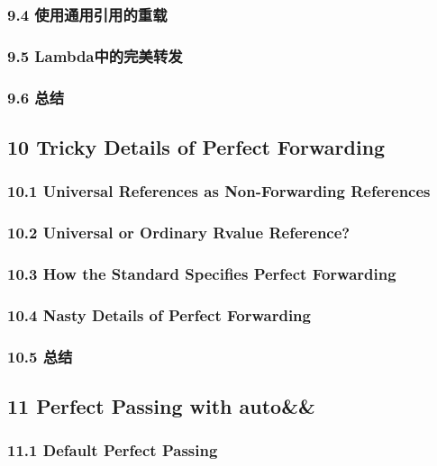 \documentclass[11pt,a4paper,UTF8]{ctexart}
\begin{document}
		\subsubsection{9.4 使用通用引用的重载}		
		\subsubsection{9.5 Lambda中的完美转发}
		
		\subsubsection{9.6 总结}
		
	\subsection{10 Tricky Details of Perfect Forwarding}
	
		\subsubsection{10.1 Universal References as Non-Forwarding References}
		
		\subsubsection{10.2 Universal or Ordinary Rvalue Reference?}
		
		\subsubsection{10.3 How the Standard Specifies Perfect Forwarding}
		
		\subsubsection{10.4 Nasty Details of Perfect Forwarding}
		
		\subsubsection{10.5 总结}
		
	\subsection{11 Perfect Passing with auto\&\&}
	
		\subsubsection{11.1 Default Perfect Passing}
		
\end{document}
